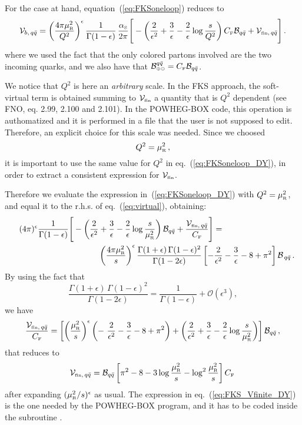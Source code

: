 \documentclass[11pt]{article} %
\newcommand{\tmtexttt}[1]{{\ttfamily{#1}}}
\def\lq{\left[}
\def\rq{\right]}
\def\({\left(}
\def\){\right)}
\newcommand\sss{\mathchoice%
{\displaystyle}%
{\scriptstyle}%
{\scriptscriptstyle}%
{\scriptscriptstyle}%
}
\newcommand\nplus{\oplus}
\newcommand\nminus{\ominus}
\newcommand\splus{{\sss \nplus}}
\newcommand\sminus{{\sss \nminus}}
\newcommand\ep{\epsilon}
\newcommand\as{\alpha_{\sss\rm S}}
\newcommand\asotpi{\frac{\as}{2\pi}}
\newcommand\matB{{\cal B}}
\newcommand\matSV{{\cal V}}
\newcommand\CF{C_{\sss\rm F}}
\newcommand\muR{\mu_{\sss\rm R}}
\newcommand\qb{\bar{q}}
\def\reff#1{(\ref{#1})}
\def\nn{\nonumber}
\begin{document}
For the case at hand, equation~\reff{eq:FKSoneloop} reduces to
\begin{equation}
\mathcal{V}_{b,\,q\qb}=\(\frac{4\pi\muR^2}{Q^2}\)^\ep\frac{1}{\Gamma(1-\ep)}
\,\asotpi
\Bigg[-\(\frac{2}{\ep^2} +\frac{3}{\ep} -\frac{2}{\ep}\log\frac{s}{Q^2}\)
\CF \matB_{q\qb}  + \matSV_{{\sss\rm fin},\,q\qb}\Bigg]\,.
\label{eq:FKSoneloop_DY}
\end{equation}
where we used the fact that the only colored partons involved are the
two incoming quarks, and we also have that
$\matB^{q\qb}_{\splus\sminus}=\CF\matB_{q\qb}$.

We notice that $Q^2$ is here an \emph{arbitrary} scale.
In the FKS approach, the soft-virtual term is obtained summing to
$\matSV_{\sss\rm fin}$ a quantity that is $Q^2$ dependent
(see FNO, eq. 2.99, 2.100 and 2.101).
In the POWHEG-BOX code, this operation is authomatized
and it is performed in a file that the user is not supposed
to edit. 
Therefore, an explicit choice for this scale was needed. Since we choosed
\begin{equation}
Q^2=\muR^2\,,
\end{equation}
it is important to use the same value for $Q^2$ in eq.~\reff{eq:FKSoneloop_DY},
in order to extract a consistent expression for $\matSV_{\sss\rm fin}$.

Therefore we evaluate the expression in~\reff{eq:FKSoneloop_DY} with
$Q^2=\muR^2$, and equal it to the r.h.s. of
eq.~\reff{eq:virtual}, obtaining:
\begin{eqnarray}
&& (4\pi)^\ep\frac{1}{\Gamma(1-\ep)}
\Bigg[-\(\frac{2}{\ep^2} +\frac{3}{\ep} -\frac{2}{\ep}\log\frac{s}{\muR^2}\)
\matB_{q\qb}  + \frac{\matSV_{{\sss\rm fin},\,q\qb}}{\CF}\Bigg] =\phantom{\hspace{3cm}} \nn \\
&& \hspace{3cm}\left( \frac{4 \pi \muR^2}{s} \right)^{\epsilon} 
\frac{\Gamma (1 + \epsilon) \, \Gamma (1 -
  \epsilon)^2}{\Gamma (1 - 2 \epsilon)}  \left[ -
  \frac{2}{\epsilon^2} - \frac{3}{\epsilon} - 8 + \pi^2
  \right]\mathcal{B}_{\,q\qb}\,.
\end{eqnarray}
By using the fact that
\begin{equation}
  \frac{\Gamma (1 + \epsilon) \,\Gamma (1 - \epsilon)^2}{\Gamma (1 - 2
  \epsilon)} = \frac{1}{\Gamma (1 - \epsilon)} +\mathcal{O}\(\epsilon^3\),
\end{equation}
we have
\begin{equation}
\frac{\matSV_{{\sss\rm fin},\,q\qb}}{\CF}=
\left[ \left( \frac{\muR^2}{s} \right)^{\epsilon} \left( -\
  \frac{2}{\epsilon^2} - \frac{3}{\epsilon} - 8 + \pi^2
  \right) +
\left(\frac{2}{\ep^2} + \frac{3}{\ep} - \frac{2}{\ep}\log\frac{s}{\muR^2} \right)\right]
\matB_{q\qb}\,,
\end{equation}
that reduces to
\begin{equation}
\matSV_{{\sss\rm fin},\,q\qb}=\matB_{q\qb} \lq \pi^2 -8 -3\log\frac{\muR^2}{s}
-\log^2\frac{\muR^2}{s} \rq \CF\,
\label{eq:FKS_Vfinite_DY}
\end{equation}
after expanding $(\muR^2/s)^\ep$ as usual.
The expression in eq.~\reff{eq:FKS_Vfinite_DY} is the one needed by
the POWHEG-BOX program, and it has to be coded inside the subroutine
\tmtexttt{setvirtual}.
\end{document}
